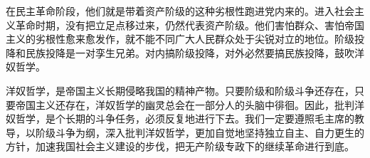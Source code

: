 \begin{maonote}
在民主革命阶段，他们就是带着资产阶级的这种劣根性跑进党内来的。进入社会主义革命时期，没有把立足点移过来，仍然代表资产阶级。他们害怕群众、害怕帝国主义的劣根性愈来愈发作，就不能不同广大人民群众处于尖锐对立的地位。阶级投降和民族投降是一对孪生兄弟。对内搞阶级投降，对外必然要搞民族投降，鼓吹洋奴哲学。

洋奴哲学，是帝国主义长期侵略我国的精神产物。只要阶级和阶级斗争还存在，只要帝国主义还存在，洋奴哲学的幽灵总会在一部分人的头脑中徘徊。因此，批判洋奴哲学，是个长期的斗争任务，必须反复地进行下去。我们一定要遵照毛主席的教导，以阶级斗争为纲，深入批判洋奴哲学，更加自觉地坚持独立自主、自力更生的方针，加速我国社会主义建设的步伐，把无产阶级专政下的继续革命进行到底。
\end{maonote}
